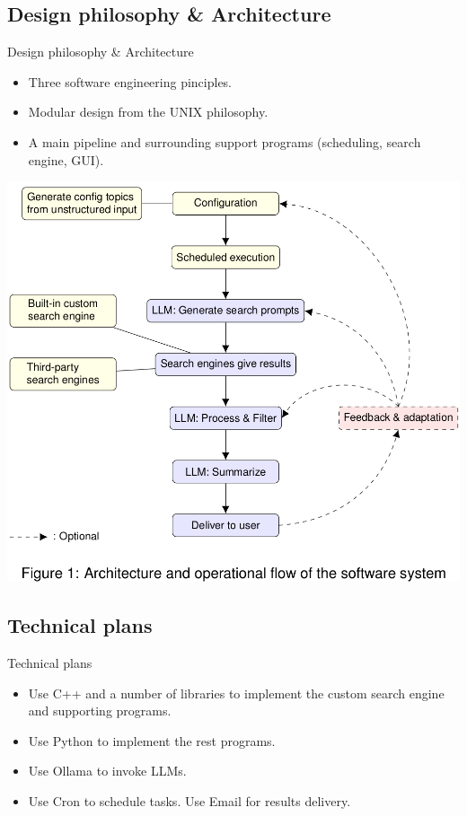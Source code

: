 \documentclass{beamer}
\begin{document}
\subsection{Design philosophy \& Architecture}
\begin{frame}{Design philosophy \& Architecture}
	\begin{itemize}
		\item Three software engineering pinciples.
		\item Modular design from the UNIX philosophy.
		\item A main pipeline and surrounding support programs (scheduling,
			search engine, GUI).
	\end{itemize}

	\begin{center}
		\includegraphics[height=.5\textheight]{./architecture.png}
	\end{center}

\end{frame}

\subsection{Technical plans}
\begin{frame}{Technical plans}
	\begin{itemize}
		\item Use C++ and a number of libraries to implement the custom search
			engine and supporting programs.
		\item Use Python to implement the rest programs.
		\item Use Ollama to invoke LLMs. 
		\item Use Cron to schedule tasks. Use Email for results delivery.
	\end{itemize}
\end{frame}
\end{document}
